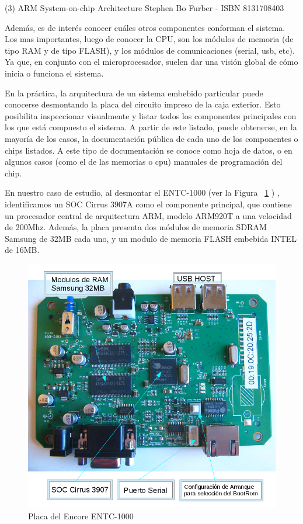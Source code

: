 \documentclass[conference]{IEEEtran}
\begin{document}
(3)
ARM System-on-chip Architecture
Stephen Bo Furber - ISBN 8131708403 

Además, es de interés conocer cuáles otros componentes conforman
el sistema. Los mas importantes, luego de conocer la CPU,
son los módulos de memoria (de
tipo RAM y de tipo FLASH), y los módulos de comunicaciones (serial, usb, etc).
Ya que, en conjunto con el microprocesador, suelen dar una visión
global de cómo inicia o funciona el sistema.

En la práctica, la arquitectura de un sistema embebido particular puede conocerse desmontando
la placa del circuito impreso de la caja exterior. Esto posibilita
inspeccionar visualmente y listar todos los componentes principales con los
que está compuesto el sistema. A partir de este listado, puede
obtenerse, en la mayoría de los casos, la documentación pública
de cada uno de los componentes o chips listados.
A este tipo de documentación se conoce como hoja de datos, o
en algunos casos (como el de las memorias o cpu) manuales de programación
del chip.

En nuestro caso de estudio, al desmontar el ENTC-1000 (ver la Figura ~\ref{fig:placa-encore} )
, identificamos
un SOC Cirrus 3907A como el componente principal,
que contiene un procesador central de arquitectura ARM, modelo ARM920T
a una velocidad de 200Mhz.
Además, la placa presenta dos módulos de memoria SDRAM Samsung de 32MB cada uno, y un modulo
de memoria FLASH embebida INTEL de 16MB.

\begin{figure}
\begin{center}
\includegraphics[scale=0.40]{placa-encore.png}
\caption{Placa del Encore ENTC-1000}
\label{fig:placa-encore}
\end{center}
\end{figure}
\end{document}
